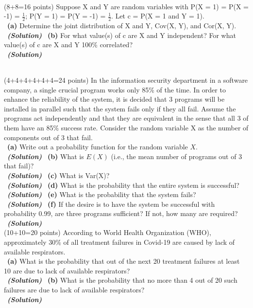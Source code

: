 \documentclass[a4 paper]{article}
\numberwithin{equation}{section}
\newcommand{\problem}[2]{~\\\fbox{\textbf{Problem #1}}\hfill (#2 points)\newline\newline}
\newcommand{\subproblem}[1]{~\newline\textbf{(#1)}}
\newcommand{\solution}{~\newline\textbf{\textit{(Solution)}} }
\newcommand{\0}{\mathbf{0}}
\begin{document}
\problem{2:}{8+8=16}
Suppose X and Y are random variables with P(X = 1) = P(X = -1) = $\frac{1}{2}$; P(Y = 1) = P(Y = -1) = $\frac{1}{2}$. Let c = P(X = 1 and Y = 1).\\

\subproblem{a} Determine the joint distribution of X and Y, Cov(X, Y), and Cor(X, Y).\\
\solution
\newline
\subproblem{b} For what value(s) of c are X and Y independent? For what value(s) of c are X and Y 100\% correlated?\\
\solution

\bigskip
\bigskip
\problem{3:}{4+4+4+4+4+4=24}
In the information security department in a software company, a single crucial program works only 85\% of the time. In order to enhance the reliability of the system, it is decided that 3 programs will be installed in parallel such that the system fails only if they all fail. Assume the programs act independently and that they are equivalent in the sense that all 3 of them have an 85\% success rate. Consider the random variable X as the number of components out of 3 that fail.\\

\subproblem{a} Write out a probability function for the random variable $X$.\\
\solution
\newline
\subproblem{b} What is $E(X)$ (i.e., the mean number of programs out of 3 that fail)?\\
\solution
\newline
\subproblem{c} What is Var(X)?\\
\solution
\newline
\subproblem{d} What is the probability that the entire system is successful?\\
\solution
\newline
\subproblem{e} What is the probability that the system fails?\\
\solution
\newline
\subproblem{f} If the desire is to have the system be successful with probability 0.99, are three programs sufficient? If not, how many are required?\\
\solution
\newpage
\problem{4:}{10+10=20}
According to World Health Organization (WHO), approximately 30\% of all treatment failures in Covid-19 are caused by lack of available respirators.\\
\subproblem{a} What is the probability that out of the next 20 treatment failures at least 10 are due to lack of available respirators?\\
\solution
\newline
\subproblem{b} What is the probability that no more than 4 out of 20 such failures are due to lack of available respirators?\\
\solution
\end{document}
